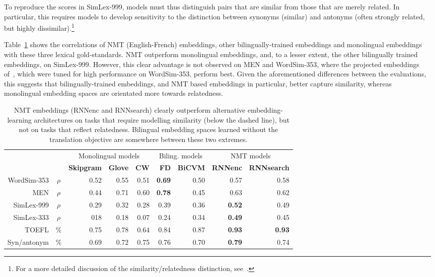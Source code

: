 To reproduce the scores in SimLex-999, models must thus distinguish pairs that are similar from those that are merely related. In particular, this requires models to develop sensitivity to the distinction between synonyms (similar) and antonyms (often strongly related, but highly dissimilar).\footnote{For a more detailed discussion of the similarity/relatedness distinction, see~\cite{hill2014simlex}.}

Table~\ref{table:perf} shows the correlations of NMT (English-French) embeddings, other bilingually-trained embeddings and monolingual embeddings with these three lexical gold-standards. NMT outperform monolingual embeddings, and, to a lesser extent, the other bilingually trained embeddings, on SimLex-999. However, this clear advantage is not observed on MEN and WordSim-353, where the projected embeddings of~\cite{faruqui2014improving}, which were tuned for high performance on WordSim-353, perform best. Given the aforementioned differences between the evaluations, this suggests that bilingually-trained embeddings, and NMT based embeddings in particular, better capture similarity, whereas monolingual embedding spaces are orientated more towards relatedness. 

\begin{table}[t]
\begin{center}
\begin{tabular}{r c | r  r  r  | r r | r r |}
\multicolumn{2}{c|}{~} &\multicolumn{3}{c|}{Monolingual models}  & \multicolumn{2}{c|}{\small Biling. models} & \multicolumn{2}{c|}{NMT models}\\  
    \multicolumn{2}{c|}{~} &\bf Skipgram &\bf Glove &\bf CW & \bf FD & \bf BiCVM & \bf RNNenc &\bf RNNsearch \\ 
\hline
WordSim-353   & \(\rho\) & 0.52 & 0.55 & 0.51 &{\bf  0.69} & 0.50 &   0.57 &  0.58 \\
MEN & \(\rho\) & 0.44 & 0.71 & 0.60 & {\bf 0.78} & 0.45 &  0.63 &  0.62  \\
\hdashline
SimLex-999 & \(\rho\) & 0.29 & 0.32 & 0.28 & 0.39 & 0.36 &   {\bf 0.52} &  0.49 \\
SimLex-333 & \(\rho\) &  018&0.18  &0.07  & 0.24  &  0.34 & { \bf 0.49}   & 0.45   \\
TOEFL & \(\%\) & 0.75 & 0.78 & 0.64 & 0.84 & 0.87 &  {\bf 0.93} &  {\bf 0.93} \\
Syn/antonym & \(\%\) & 0.69  & 0.72  &  0.75 & 0.76 & 0.70 &  {\bf 0.79} & 0.74 \\
\end{tabular}
\caption{ NMT embeddings (RNNenc and RNNsearch) clearly outperform alternative embedding-learning architectures on tasks that require modelling similarity (below the dashed line), but not on tasks that reflect relatedness. Bilingual embedding spaces learned without the translation objective are somewhere between these two extremes.}
\label{table:perf}
\end{center}
\vspace{-5mm}
\end{table}


